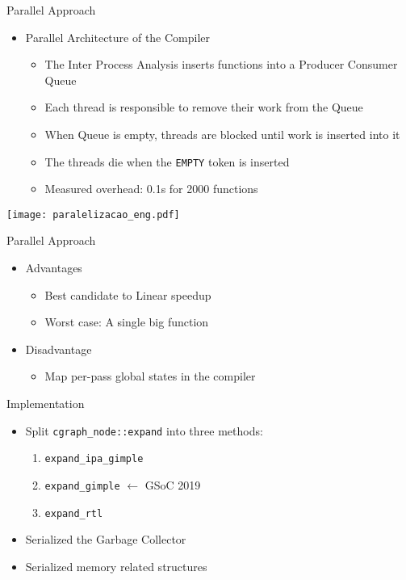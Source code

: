 \begin{frame}{Parallel Approach}
    \begin{itemize}
        \item Parallel Architecture of the Compiler
            \begin{itemize}
                \item The Inter Process Analysis inserts functions into a Producer Consumer Queue
                \item Each thread is responsible to remove their work from the Queue
                \item When Queue is empty, threads are blocked until work is inserted into it
                \item The threads die when the \texttt{EMPTY} token is inserted
                \item Measured overhead: 0.1s for 2000 functions
             \end{itemize}
\end{itemize}
 \centering
 \texttt{[image: paralelizacao\_eng.pdf]}
\end{frame}

\begin{frame}{Parallel Approach}
    \begin{itemize}
        \item Advantages
            \begin{itemize}
                \item Best candidate to Linear speedup
                \item Worst case: A single big function
            \end{itemize}
        \item Disadvantage
            \begin{itemize}
              \item Map per-pass global states in the compiler
            \end{itemize}
    \end{itemize}
\end{frame}

\begin{frame}{Implementation}
    \begin{itemize}
        \item Split \texttt{cgraph\_node::expand} into three methods:
            \begin{enumerate}
                \item \texttt{expand\_ipa\_gimple}
                \item \texttt{expand\_gimple} $\longleftarrow$ GSoC 2019
                \item \texttt{expand\_rtl}
            \end{enumerate}
        \item Serialized the Garbage Collector
        \item Serialized memory related structures
    \end{itemize}
\end{frame}

